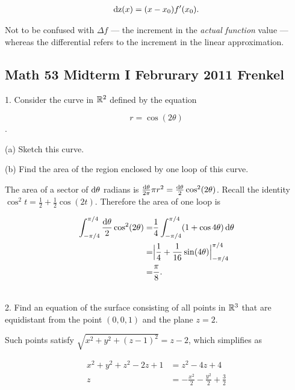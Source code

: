 \documentclass[12pt]{article}
\begin{document}
\begin{align*}
  \operatorname{\text{dz}}(x) = (x - x_0)f'(x_0).
\end{align*}


Not to be confused with $\Delta f$ --- the increment in the \textit{actual
  function} value --- whereas the differential refers to the increment in the
linear approximation.

\newpage
\subsection*{Math 53 Midterm I Februrary 2011 Frenkel}

1. Consider the curve in $\mathbb{R}^2$ defined by the equation

$$
r = \cos(2\theta)
$$.

(a) Sketch this curve.

(b) Find the area of the region enclosed by one loop of this curve.\\

\begin{mdframed}
The area of a sector of $\operatorname{\text{d}\theta}$ radians is $\frac{\operatorname{\text{d}\theta}}{2\pi}\pi r^2 = \frac{\operatorname{\text{d}\theta}}{2}\cos^2(2\theta)$. Recall the identity $\cos^2 t = \frac{1}{2} + \frac{1}{2}\cos(2t)$. Therefore the area of one loop is

\begin{align*}
  \int_{-\pi/4}^{\pi/4} \frac{\operatorname{\text{d}\theta}}{2}\cos^2(2\theta)
  =&\frac{1}{4}\int_{-\pi/4}^{\pi/4} (1 + \cos 4\theta) \operatorname{\text{d}\theta} \\
  =& \Big|\frac{1}{4} + \frac{1}{16}\sin(4\theta)\Big|_{-\pi/4}^{\pi/4} \\
  =& \frac{\pi}{8}.
\end{align*}

\end{mdframed}~\\

2. Find an equation of the surface consisting of all points in $\mathbb{R}^3$ that are equidistant
from the point $(0, 0, 1)$ and the plane $z = 2$.\\

\begin{mdframed}
Such points satisfy $\sqrt{x^2 + y^2 + (z - 1)^2} = z - 2$, which simplifies as

\begin{align*}
x^2 + y^2 + z^2 - 2z + 1 &= z^2 - 4z + 4 \\
z &= -\frac{x^2}{2} -\frac{y^2}{2} + \frac{3}{2} \\
\end{align*}

\end{mdframed}~\\
\end{document}
